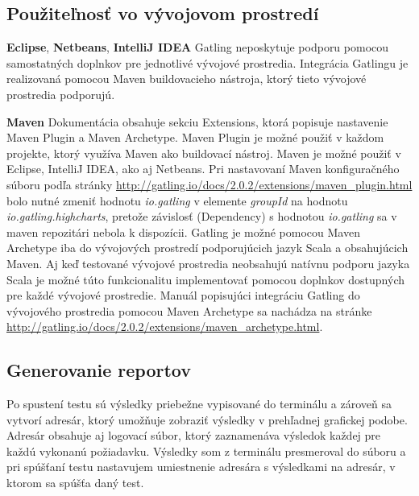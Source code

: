 \documentclass[12pt,oneside,final]{fithesis-utf8}
\begin{document}
\subsection{Použiteľnosť vo vývojovom prostredí}
\textbf{Eclipse}, \textbf{Netbeans}, \textbf{IntelliJ IDEA}
\newline
Gatling neposkytuje podporu pomocou samostatných doplnkov pre jednotlivé vývojové prostredia. Integrácia Gatlingu je realizovaná pomocou Maven buildovacieho nástroja, ktorý tieto vývojové prostredia podporujú.

\newpage
\noindent \textbf{Maven}
\newline
Dokumentácia obsahuje sekciu Extensions, ktorá popisuje nastavenie Maven Plugin a Maven Archetype.
\newline Maven Plugin je možné použiť v každom projekte, ktorý využíva Maven ako buildovací nástroj. Maven je možné použiť v Eclipse, IntelliJ IDEA, ako aj Netbeans. Pri nastavovaní Maven konfiguračného súboru podľa stránky \url{http://gatling.io/docs/2.0.2/extensions/maven_plugin.html} bolo nutné zmeniť hodnotu \textit{io.gatling} v elemente \textit{groupId} na hodnotu \textit{io.gatling.highcharts}, pretože závislosť (Dependency) s hodnotou \textit{io.gatling} sa v maven repozitári nebola k dispozícii.
\newline
\newline
Gatling je možné pomocou Maven Archetype iba do vývojových prostredí podporujúcich jazyk Scala a obsahujúcich Maven. Aj keď testované vývojové prostredia neobsahujú natívnu podporu jazyka Scala je možné túto funkcionalitu implementovať pomocou doplnkov dostupných pre každé vývojové prostredie. Manuál popisujúci integráciu Gatling do vývojového prostredia pomocou Maven Archetype sa nachádza na stránke \url{http://gatling.io/docs/2.0.2/extensions/maven_archetype.html}.
\newline

\subsection{Generovanie reportov}
Po spustení testu sú výsledky priebežne vypisované do terminálu a zároveň sa vytvorí adresár, ktorý umožňuje zobraziť výsledky v prehľadnej grafickej podobe. Adresár obsahuje aj logovací súbor, ktorý zaznamenáva výsledok každej pre každú vykonanú požiadavku. Výsledky som z terminálu presmeroval do súboru a pri spúšťaní testu nastavujem umiestnenie adresára s výsledkami na adresár, v ktorom sa spúšťa daný test.
\end{document}
